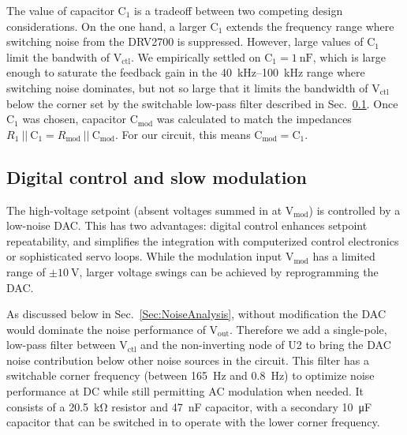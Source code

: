 \documentclass[aip,rsi,reprint]{revtex4-1} %
\begin{document}
The value of capacitor $\text{C}_1$ is a tradeoff between two competing design considerations.
On the one hand, a larger $\text{C}_1$ extends the frequency range where switching noise from the DRV2700 is suppressed.
However, large values of $\text{C}_1$ limit the bandwith of $\text{V}_\text{ctl}$.
We empirically settled on $\text{C}_1 = \SI{1}{\nano\farad}$, which is large enough to saturate the feedback gain in the \SI{40}{\kilo\hertz}--\SI{100}{\kilo\hertz} range where switching noise dominates, but not so large that it limits the bandwidth of $\text{V}_\text{ctl}$ below the corner set by the switchable low-pass filter described in Sec.~\ref{Sec:SlowModulationMOS}.
Once $\text{C}_1$ was chosen, capacitor $\text{C}_\text{mod}$ was calculated to match the impedances $R_1~||~\text{C}_1 = R_\text{mod}~||~\text{C}_\text{mod}$.
For our circuit, this means $\text{C}_\text{mod} = \text{C}_1$.


\subsection{Digital control and slow modulation}
\label{Sec:SlowModulationMOS}

The high-voltage setpoint (absent voltages summed in at $\text{V}_\text{mod}$) is controlled by a low-noise DAC.
This has two advantages: digital control enhances setpoint repeatability, and simplifies the integration with computerized control electronics or sophisticated servo loops.
While the modulation input $\text{V}_\text{mod}$ has a limited range of $\pm\SI{10}{\volt}$, larger voltage swings can be achieved by reprogramming the DAC.

As discussed below in Sec.~\ref{Sec:NoiseAnalysis}, without modification the DAC would dominate the noise performance of $\text{V}_\text{out}$.
Therefore we add a single-pole, low-pass filter between $\text{V}_\text{ctl}$ and the non-inverting node of U2 to bring the DAC noise contribution below other noise sources in the circuit.
This filter has a switchable corner frequency (between \SI{165}{\hertz} and \SI{0.8}{\hertz}) to optimize noise performance at DC while still permitting AC modulation when needed.
It consists of a \SI{20.5}{\kilo\ohm} resistor and \SI{47}{\nano\farad} capacitor, with a secondary \SI{10}{\micro\farad} capacitor that can be switched in to operate with the lower corner frequency.
\end{document}
